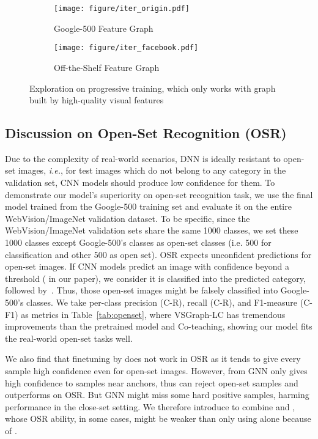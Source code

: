 \documentclass[sigconf]{acmart}
\begin{document}
\begin{figure}[t]
	\centering
	\begin{subfigure}{.22\textwidth}
		\centering
\texttt{[image: figure/iter\_origin.pdf]}  
		\caption{Google-500 Feature Graph}
		\label{fig:iter1}
	\end{subfigure}
	\begin{subfigure}{.22\textwidth}
		\centering
\texttt{[image: figure/iter\_facebook.pdf]}  
		\caption{Off-the-Shelf Feature Graph}
		\label{fig:iter2}
	\end{subfigure}
\caption{Exploration on progressive training, which only works with graph built by high-quality visual features}
	\label{fig:iter}
\end{figure}


\subsection{Discussion on Open-Set Recognition (OSR)}
\label{S:openset}
Due to the complexity of real-world scenarios, DNN is ideally resistant to open-set images, \textit{i.e.}, for test images which do not belong to any category in the validation set, CNN models should produce low confidence for them.
To demonstrate our model's superiority on open-set recognition task, we use the final model trained from the Google-500 training set and evaluate it on the entire WebVision/ImageNet validation dataset. 
To be specific, since the WebVision/ImageNet validation sets share the same 1000 classes, we set these 1000 classes except Google-500's classes as open-set classes (i.e. 500 for classification and other 500 as open set). 
OSR expects unconfident predictions for open-set images. 
If CNN models predict an image with confidence beyond a threshold ( in our paper), we consider it is classified into the predicted category, followed by~\cite{perera2019ocgan,yoshihashi2019classification}. 
Thus, those open-set images might be falsely classified into Google-500's classes. 
We take per-class precision (C-R), recall (C-R), and F1-measure (C-F1) as metrics in Table~\ref{tab:openset}, where VSGraph-LC has tremendous improvements than the pretrained model and Co-teaching, showing our model fits the real-world open-set tasks well.

We also find that finetuning by  does not work in OSR as it tends to give every sample high confidence even for open-set images.
However,  from GNN only gives high confidence to samples near anchors, thus can reject open-set samples and outperforms  on OSR. But GNN might miss some hard positive samples, harming performance in the close-set setting. We therefore introduce  to combine  and , whose OSR ability, in some cases, might be weaker than only using  alone because of .
    
\end{document}
